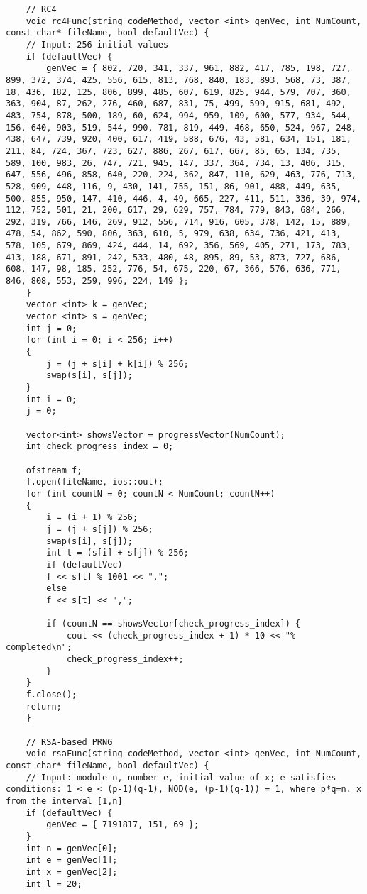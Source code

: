 \documentclass[bachelor, och, coursework]{shiza}
\begin{document}
\begin{verbatim}
	// RC4
	void rc4Func(string codeMethod, vector <int> genVec, int NumCount, const char* fileName, bool defaultVec) {
	// Input: 256 initial values
	if (defaultVec) {
		genVec = { 802, 720, 341, 337, 961, 882, 417, 785, 198, 727, 899, 372, 374, 425, 556, 615, 813, 768, 840, 183, 893, 568, 73, 387, 18, 436, 182, 125, 806, 899, 485, 607, 619, 825, 944, 579, 707, 360, 363, 904, 87, 262, 276, 460, 687, 831, 75, 499, 599, 915, 681, 492, 483, 754, 878, 500, 189, 60, 624, 994, 959, 109, 600, 577, 934, 544, 156, 640, 903, 519, 544, 990, 781, 819, 449, 468, 650, 524, 967, 248, 438, 647, 739, 920, 400, 617, 419, 588, 676, 43, 581, 634, 151, 181, 211, 84, 724, 367, 723, 627, 886, 267, 617, 667, 85, 65, 134, 735, 589, 100, 983, 26, 747, 721, 945, 147, 337, 364, 734, 13, 406, 315, 647, 556, 496, 858, 640, 220, 224, 362, 847, 110, 629, 463, 776, 713, 528, 909, 448, 116, 9, 430, 141, 755, 151, 86, 901, 488, 449, 635, 500, 855, 950, 147, 410, 446, 4, 49, 665, 227, 411, 511, 336, 39, 974, 112, 752, 501, 21, 200, 617, 29, 629, 757, 784, 779, 843, 684, 266, 292, 319, 766, 146, 269, 912, 556, 714, 916, 605, 378, 142, 15, 889, 478, 54, 862, 590, 806, 363, 610, 5, 979, 638, 634, 736, 421, 413, 578, 105, 679, 869, 424, 444, 14, 692, 356, 569, 405, 271, 173, 783, 413, 188, 671, 891, 242, 533, 480, 48, 895, 89, 53, 873, 727, 686, 608, 147, 98, 185, 252, 776, 54, 675, 220, 67, 366, 576, 636, 771, 846, 808, 553, 259, 996, 224, 149 };
	}
	vector <int> k = genVec;
	vector <int> s = genVec;
	int j = 0;
	for (int i = 0; i < 256; i++)
	{
		j = (j + s[i] + k[i]) % 256;
		swap(s[i], s[j]);
	}
	int i = 0;
	j = 0;
	
	vector<int> showsVector = progressVector(NumCount);
	int check_progress_index = 0;
	
	ofstream f;
	f.open(fileName, ios::out);
	for (int countN = 0; countN < NumCount; countN++)
	{
		i = (i + 1) % 256;
		j = (j + s[j]) % 256;
		swap(s[i], s[j]);
		int t = (s[i] + s[j]) % 256;
		if (defaultVec)
		f << s[t] % 1001 << ",";
		else
		f << s[t] << ",";
		
		if (countN == showsVector[check_progress_index]) {
			cout << (check_progress_index + 1) * 10 << "% completed\n";
			check_progress_index++;
		}
	}
	f.close();
	return;
	}
	
	// RSA-based PRNG
	void rsaFunc(string codeMethod, vector <int> genVec, int NumCount, const char* fileName, bool defaultVec) {
	// Input: module n, number e, initial value of x; e satisfies conditions: 1 < e < (p-1)(q-1), NOD(e, (p-1)(q-1)) = 1, where p*q=n. x from the interval [1,n]
	if (defaultVec) {
		genVec = { 7191817, 151, 69 };
	}
	int n = genVec[0];
	int e = genVec[1];
	int x = genVec[2];
	int l = 20;
	

\end{verbatim}
\end{document}
